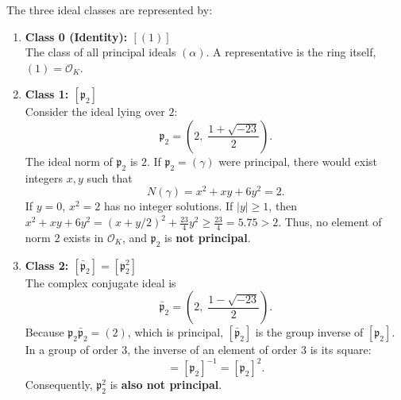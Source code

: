 \documentclass[a4paper]{article}
\begin{document}
The three ideal classes are represented by:
\begin{enumerate}
 \item \textbf{Class 0 (Identity): $[(1)]$} \\
 The class of all principal ideals $(\alpha)$. A representative is the ring itself, $(1) = \mathcal{O}_K$.
 
 \item \textbf{Class 1: $[\mathfrak{p}_2]$} \\
 Consider the ideal lying over $2$:
 \begin{equation}
  \mathfrak{p}_2 = \left(2, \; \frac{1 + \sqrt{-23}}{2}\right).
 \end{equation}
 The ideal norm of $\mathfrak{p}_2$ is $2$. If $\mathfrak{p}_2 = (\gamma)$ were principal, there would exist integers $x, y$ such that
 \begin{equation}
  N(\gamma) = x^2 + xy + 6y^2 = 2.
 \end{equation}
 If $y = 0$, $x^2 = 2$ has no integer solutions. If $|y| \ge 1$, then $x^2 + xy + 6y^2 = (x + y/2)^2 + \frac{23}{4}y^2 \ge \frac{23}{4} = 5.75 > 2$. Thus, no element of norm $2$ exists in $\mathcal{O}_K$, and $\mathfrak{p}_2$ is \textbf{not principal}.
 
 \item \textbf{Class 2: $[\bar{\mathfrak{p}}_2] = [\mathfrak{p}_2^2]$} \\
 The complex conjugate ideal is
 \begin{equation}
  \bar{\mathfrak{p}}_2 = \left(2, \; \frac{1 - \sqrt{-23}}{2}\right).
 \end{equation}
 Because $\mathfrak{p}_2 \bar{\mathfrak{p}}_2 = (2)$, which is principal, $[\bar{\mathfrak{p}}_2]$ is the group inverse of $[\mathfrak{p}_2]$. In a group of order $3$, the inverse of an element of order $3$ is its square:
 \begin{equation}
  [\bar{\mathfrak{p}}_2] = [\mathfrak{p}_2]^{-1} = [\mathfrak{p}_2]^2.
 \end{equation}
 Consequently, $\mathfrak{p}_2^2$ is \textbf{also not principal}.
\end{enumerate}
\end{document}
